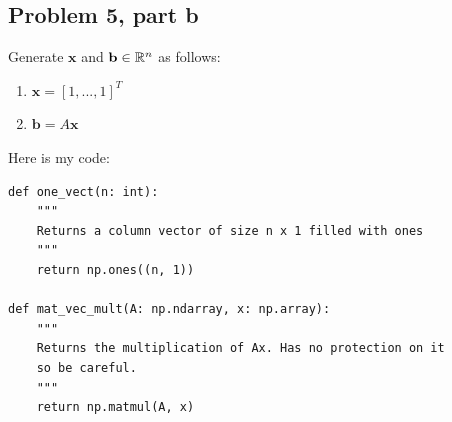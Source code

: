 \subsection{Problem 5, part b}
Generate $\textbf{x}$ and $\textbf{b} \in \mathbb{R}^n$ as follows:
\begin{enumerate}
    \item $\textbf{x} = [1, ..., 1]^T$
    \item $\textbf{b} = A\textbf{x}$
\end{enumerate}
\partbreak
\begin{solution}
    
    Here is my code:
    \begin{lstlisting}
def one_vect(n: int):
    """
    Returns a column vector of size n x 1 filled with ones 
    """
    return np.ones((n, 1))

def mat_vec_mult(A: np.ndarray, x: np.array):
    """
    Returns the multiplication of Ax. Has no protection on it
    so be careful.
    """
    return np.matmul(A, x)
    \end{lstlisting}
\end{solution}
\newpage
